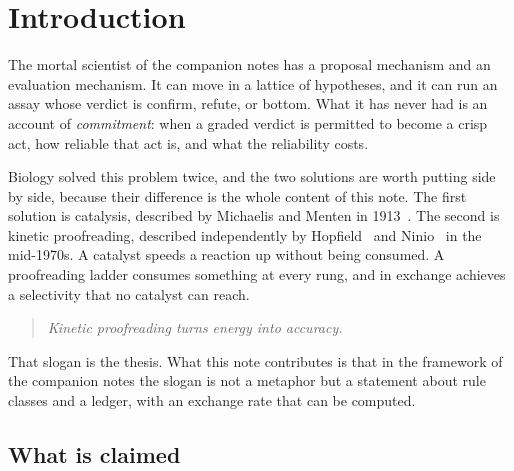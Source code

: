 \documentclass[11pt]{article}
\theoremstyle{plain}
\theoremstyle{definition}
\theoremstyle{remark}
\begin{document}
\tableofcontents

\section{Introduction}

The mortal scientist of the companion notes has a proposal mechanism and an
evaluation mechanism. It can move in a lattice of hypotheses, and it can run
an assay whose verdict is confirm, refute, or bottom. What it has never had is
an account of \emph{commitment}: when a graded verdict is permitted to become
a crisp act, how reliable that act is, and what the reliability costs.

Biology solved this problem twice, and the two solutions are worth putting
side by side, because their difference is the whole content of this note. The
first solution is catalysis, described by Michaelis and Menten in
1913~\cite{MM1913}. The second is kinetic proofreading, described independently
by Hopfield~\cite{Hopfield1974} and Ninio~\cite{Ninio1975} in the mid-1970s. A
catalyst speeds a reaction up without being consumed. A proofreading ladder
consumes something at every rung, and in exchange achieves a selectivity that
no catalyst can reach.

\begin{quote}
\emph{Kinetic proofreading turns energy into accuracy.}
\end{quote}

That slogan is the thesis. What this note contributes is that in the framework
of the companion notes the slogan is not a metaphor but a statement about rule
classes and a ledger, with an exchange rate that can be computed.

\subsection{What is claimed}
\end{document}
